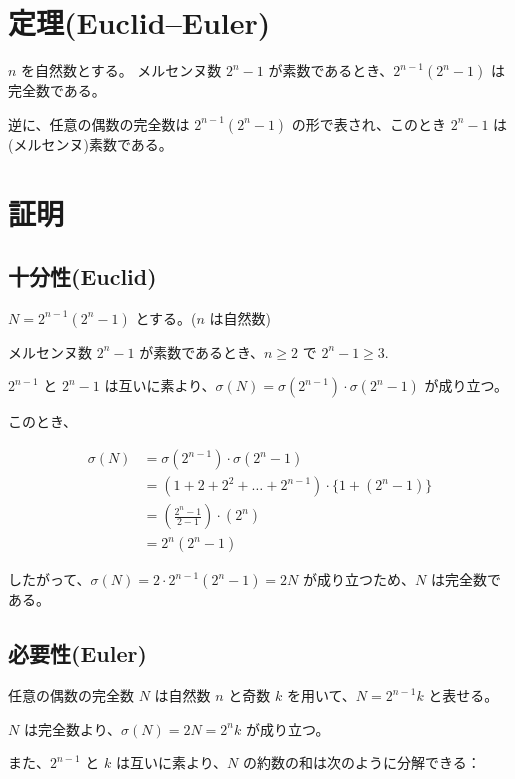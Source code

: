 \section{定理(Euclid--Euler)}

\( n \) を自然数とする。
メルセンヌ数 \( 2^n - 1 \) が素数であるとき、\( 2^{n-1}(2^n - 1) \) は完全数である。

逆に、任意の偶数の完全数は \( 2^{n-1}(2^n - 1) \) の形で表され、このとき \( 2^n - 1 \) は(メルセンヌ)素数である。

\section{証明}

\subsection{十分性(Euclid)}

\( N = 2^{n-1}(2^n - 1) \) とする。(\(n \) は自然数)

メルセンヌ数 \( 2^n - 1 \) が素数であるとき、\( n \geq 2 \) で \( 2^n - 1 \geq 3 \).

\( 2^{n-1} \) と \( 2^n - 1 \) は互いに素より、\( \sigma(N) = \sigma(2^{n-1}) \cdot \sigma(2^n - 1) \) が成り立つ。

このとき、

\begin{align*}
\sigma(N) &= \sigma(2^{n-1}) \cdot \sigma(2^n - 1) \\
          &= (1 + 2 + 2^2 + \ldots + 2^{n-1}) \cdot \{1 + (2^n - 1)\} \\
          &= (\frac{2^n-1}{2-1}) \cdot (2^n) \\
          &= 2^n(2^n - 1)
\end{align*}

したがって、\(\sigma(N) = 2 \cdot 2^{n-1}(2^n - 1) = 2N\) が成り立つため、\( N \) は完全数である。

\subsection{必要性(Euler)}

任意の偶数の完全数 \( N \) は自然数 \( n \) と奇数 \( k \) を用いて、\( N = 2^{n-1}k \) と表せる。

\( N \) は完全数より、\(\sigma(N) = 2N = 2^{n}k\) が成り立つ。

また、\(2^{n-1}\) と \( k \) は互いに素より、\(N\) の約数の和は次のように分解できる：

